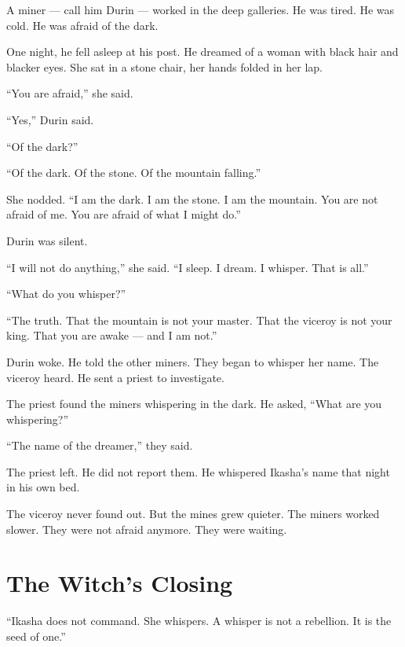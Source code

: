 \documentclass[10pt,twoside]{book}
\begin{document}
A miner --- call him Durin --- worked in the deep galleries. He was tired. He was cold. He was afraid of the dark.

One night, he fell asleep at his post. He dreamed of a woman with black hair and blacker eyes. She sat in a stone chair, her hands folded in her lap.

``You are afraid,'' she said.

``Yes,'' Durin said.

``Of the dark?''

``Of the dark. Of the stone. Of the mountain falling.''

She nodded. ``I am the dark. I am the stone. I am the mountain. You are not afraid of me. You are afraid of what I might do.''

Durin was silent.

``I will not do anything,'' she said. ``I sleep. I dream. I whisper. That is all.''

``What do you whisper?''

``The truth. That the mountain is not your master. That the viceroy is not your king. That you are awake --- and I am not.''

Durin woke. He told the other miners. They began to whisper her name. The viceroy heard. He sent a priest to investigate.

The priest found the miners whispering in the dark. He asked, ``What are you whispering?''

``The name of the dreamer,'' they said.

The priest left. He did not report them. He whispered Ikasha's name that night in his own bed.

The viceroy never found out. But the mines grew quieter. The miners worked slower. They were not afraid anymore. They were waiting.

\section*{The Witch's Closing}
``Ikasha does not command. She whispers. A whisper is not a rebellion. It is the seed of one.''
\end{document}
